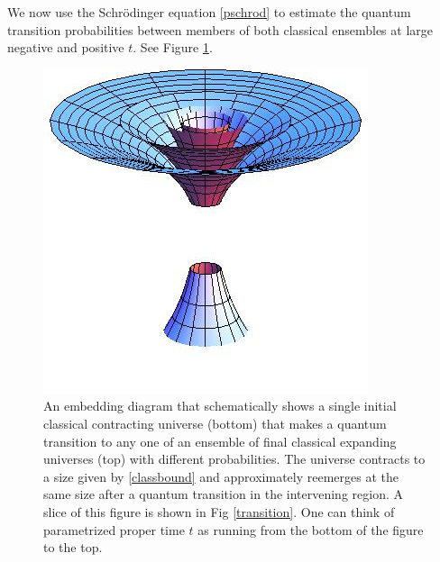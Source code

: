 \documentclass[prd,floats,superscriptaddress,eqsecnum,floatfix,nofootinbib,12pt]{revtex4}
\begin{document}
{{{{We now use the Schr\"odinger equation \eqref{pschrod} to estimate the quantum transition probabilities between members of both classical ensembles at large negative and positive $t$.  See Figure \ref{bnc-hist}. 
\begin{figure}[t]
\includegraphics[width=4.in]{embed-bh.jpg}
\caption{ An embedding diagram that schematically shows a single  initial classical contracting universe (bottom) that makes a quantum transition to any one of an ensemble of final classical expanding universes (top) with different probabilities.  The universe contracts to a size given by \eqref{classbound} and approximately reemerges at the same size  after a quantum transition in the intervening region. A slice of this figure is shown in Fig \ref{transition}. One can think of parametrized proper time $t$  as running from the bottom of the figure to the top.} 
\label{bnc-hist}
\end{figure}

}}}}
\end{document}
